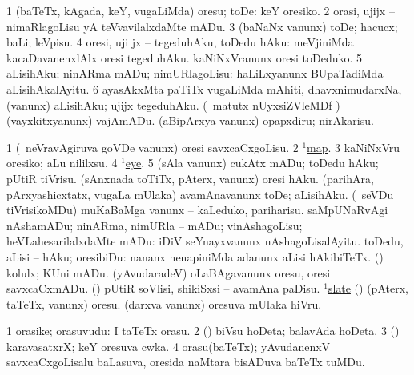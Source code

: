 \bentry
{} 
\gl{\sakirx}
\expl{}
\bmng
\bnum
\num{1} (baTeTx, kAgada, keY, \mo vugaLiMda) oresu; toDe:  keY oresiko. 
\num{2} orasi, ujijx -- nimaRlagoLisu yA teVvavilalxdaMte mADu. 
\num{3} (baNaNx \mo vanunx) toDe; hacucx; baLi; leVpisu. 
\num{4} oresi, uji jx -- tegeduhAku, toDedu hAku:  meVjiniMda kacaDavanenxlAlx oresi tegeduhAku.  kaNiNxVranunx oresi toDeduko. 
\num{5} aLisihAku; ninARma mADu; nimURlagoLisu:  haLiLxyanunx BUpaTadiMda aLisihAkalAyitu. 
\num{6} ayasAkxMta paTiTx \mo vugaLiMda mAhiti, dhavxnimudarxNa, (\mo vanunx) aLisihAku; ujijx tegeduhAku. 
 (\AseTxrXV\ matutx nUyxsiZVleMDf \ashi) 
\banum
{} (vayxkitxyanunx) vajAmADu. 
 (aBipArxya \mo vanunx) opapxdiru; nirAkarisu. 
\eanum
\numie
\enum
\emng

\noindent
\gl{\pagu}
\bmng
\bnum
\num{1}  (\kanmu\ neVravAgiruva goVDe \mo vanunx) oresi savxcaCxgoLisu. 
\num{2}  \hyperref{kandict_m.pdf}{M}{map(1) pagu(4)}{$^1$map}. 
\num{3}  kaNiNxVru oresiko; aLu nililxsu. 
\num{4}  \hyperref{kandict_e.pdf}{E}{eye(1) nuga(53)}{$^1$eye}. 
\num{5}  (sAla \mo vanunx) cukAtx mADu; toDedu hAku; pUtiR tiVrisu. 
  
\banum
{} (sAnxnada toTiTx, pAterx, \mo vanunx) oresi hAku. 
 (parihAra, pArxyashicxtatx, \mo vugaLa mUlaka) avamAnavanunx toDe; aLisihAku. 
 (\kanmu\ seVDu tiVrisikoMDu) muKaBaMga \mo vanunx -- kaLeduko, pariharisu. 
 saMpUNaRvAgi nAshamADu; ninARma, nimURla -- mADu; vinAshagoLisu; heVLahesarilalxdaMte mADu:  iDiV seYnayxvanunx nAshagoLisalAyitu. 
 toDedu, aLisi -- hAku; oresibiDu:  nananx nenapiniMda adanunx aLisi hAkibiTeTx. 
 (\ashi) kolulx; KUni mADu. 
 (yAvudaradeV) oLaBAgavanunx oresu, oresi savxcaCxmADu. 
\eanum
\numie
{} 
\banum
{}  (\AmA) pUtiR soVlisi, shikiSxsi -- avamAna paDisu. 
  \hyperref{kandict_s.pdf}{S}{slate(1) pagu(5)}{$^1$slate}  
\eanum
\numie
{}  
\banum
{} (\birx) (pAterx, taTeTx, \mo vanunx) oresu. 
 (darxva \mo vanunx) oresuva mUlaka hiVru. 
\eanum
\numie
\enum
\emng
\eentry

\bentry
{}
\gl{\nA}
\bmng
\bnum
\num{1} orasike; orasuvudu:  I taTeTx orasu. 
\num{2} (\ashi) biVsu hoDeta; balavAda hoDeta. 
\num{3} (\ashi) karavasatxrX; keY oresuva cwka. 
\num{4} orasu(baTeTx); yAvudanenxV savxcaCxgoLisalu baLasuva, oresida naMtara bisADuva baTeTx tuMDu. 
\enum
\emng
\eentry

